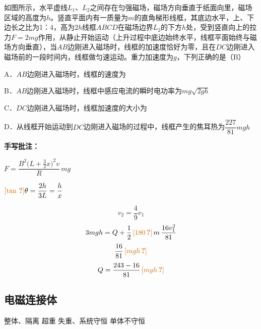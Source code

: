 \begin{problem}[18]
如图所示，水平虚线$L_1$、$L_2$之间存在匀强磁场，磁场方向垂直于纸面向里，磁场区域的高度为$h$。竖直平面内有一质量为$m$的直角梯形线框，其底边水平，上、下边长之比为1：4，高为$2h$线框$ABCD$在磁场边界$L_2$的下方$h$处，受到竖直向上的拉力$F=2mg$作用，从静止开始运动（上升过程中底边始终水平，线框平面始终与磁场方向垂直），当$AB$边刚进入磁场时，线框的加速度恰好为零，且在$DC$边刚进入磁场前的一段时间内，线框做匀速运动。重力加速度为$g$，下列正确的是（B）%


A．$AB$边刚进入磁场时，线框的速度为%

B．$AB$边刚进入磁场时，线框中感应电流的瞬时电功率为$mg\sqrt{2gh}$\ \unclear{$\checkmark$}%

C．$DC$边刚进入磁场时，线框加速度的大小为%

D．从线框开始运动到$DC$边刚进入磁场的过程中，线框产生的焦耳热为$\dfrac{227}{81}mgh$\ \red{$\checkmark$}%

\textbf{手写批注：}

$F=\dfrac{B^2\bigl(L+\frac{3}{2}x\bigr)^2v}{R}\,mg$%

$\unclear{\tan}\theta=\dfrac{2h}{3L}=\dfrac{h}{x}$\quad {}%
\end{problem}

\[
v_2=\frac{4}{9}v_1
\]
\[
3mgh=Q+\frac{1}{2}\,\unclear{180}\,m\,\frac{16v_1^{2}}{81}
\]%
\[
\frac{16}{81}\,\unclear{mgh}
\]%
\[
Q=\frac{243-16}{81}\,\unclear{mgh}
\]%

\subsection{电磁连接体}
整体、隔离 \quad 超重 失重、系统守恒 \quad 单体不守恒

